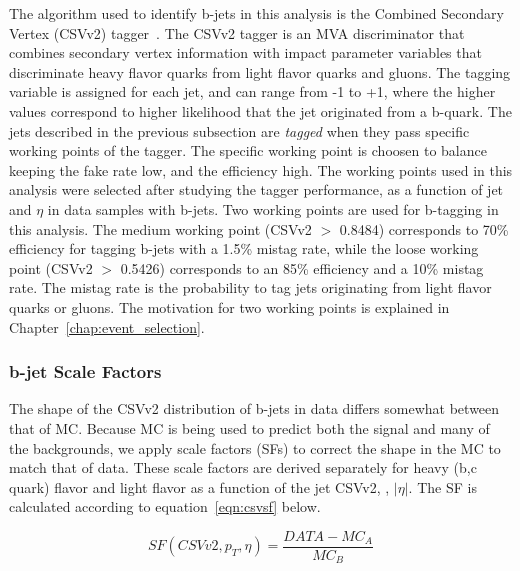 The algorithm used to identify b-jets in this analysis is the Combined Secondary Vertex (CSVv2) tagger~\cite{csvv2}. The CSVv2 tagger is an MVA discriminator that
combines secondary vertex information with impact parameter variables that discriminate heavy flavor quarks from light flavor quarks and gluons. The tagging variable is assigned
for each jet, and can range from -1 to +1, where the higher values correspond to higher likelihood that the jet originated from a b-quark. The jets described in the previous
subsection are \emph{tagged} when they pass specific working points of the tagger. The specific working point is choosen to balance keeping the fake rate low, and the efficiency
high. The working points used in this analysis were selected after studying the tagger performance, as a function of jet \pt and $\eta$ in data samples with b-jets. Two working points
are used for b-tagging in this analysis. The medium working point (CSVv2 $>$ 0.8484) corresponds to 70\% efficiency for tagging
b-jets with a 1.5\% mistag rate, while the loose working point (CSVv2 $>$ 0.5426) corresponds to an 85\% efficiency and a 10\% mistag rate. The mistag rate is the probability
to tag jets originating from light flavor quarks or gluons. The motivation for two working points is explained in Chapter~\ref{chap:event_selection}. 

\subsubsection{b-jet Scale Factors}
The shape of the CSVv2 distribution of b-jets in data differs somewhat between that of MC. Because MC is being used to predict both the signal and many of the backgrounds, we apply scale factors (SFs)
to correct the shape in the MC to match that of data. These scale factors are derived separately for heavy (b,c quark) flavor and light flavor as a function of the jet CSVv2, \pt, $|\eta|$. The SF is 
calculated according to equation~\ref{eqn:csvsf} below. 

\begin{equation}
\label{eqn:csvsf}
  SF(CSVv2,p_{T},\eta) = \frac{DATA-MC_{A}}{MC_{B}}
\end{equation}

